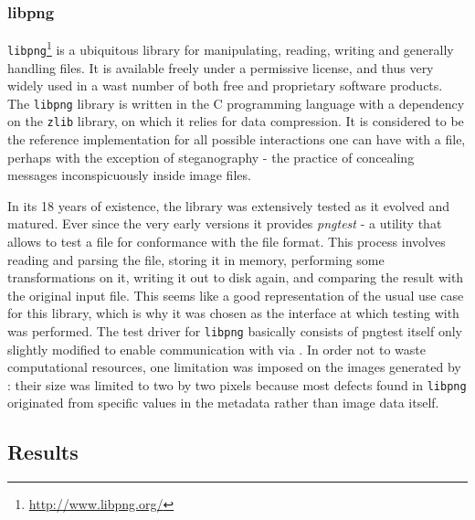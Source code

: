 \subsubsection{libpng}
\texttt{libpng}\footnote{\url{http://www.libpng.org/}} is a ubiquitous library for manipulating, reading,
writing and generally handling \png files. It is available freely under a permissive license, and thus very
widely used in a wast number of both free and proprietary software products. The \texttt{libpng} library is
written in the {\small C} programming language with a dependency on the \texttt{zlib} library, on which it
relies for data compression. It is considered to be the reference implementation for all possible interactions
one can have with a \png file, perhaps with the exception of steganography - the practice of concealing
messages inconspicuously inside image files.

In its 18 years of existence, the library was extensively tested as it evolved and matured. Ever since the very
early versions it provides \emph{pngtest} - a utility that allows to test a \png file for conformance with the
\png file format. This process involves reading and parsing the file, storing it in memory, performing some
transformations on it, writing it out to disk again, and comparing the result with the original input file.
This seems like a good representation of the usual use case for this library, which is why it was chosen as
the interface at which testing with \xmlmate was performed. The test driver for \texttt{libpng} basically
consists of pngtest itself only slightly modified to enable communication with \xmlmate via \zmq. In order not
to waste computational resources, one limitation was imposed on the images generated by \xmlmate: their size
was limited to two by two pixels because most defects found in \texttt{libpng} originated from specific values
in the metadata rather than image data itself.

\subsection{Results}


